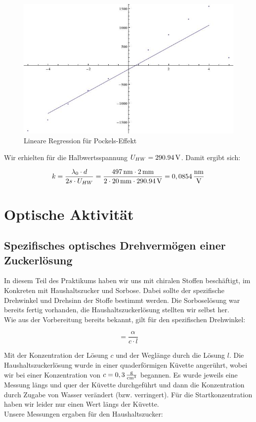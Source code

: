 \documentclass[a4paper,titlepage]{scrartcl}
\numberwithin{equation}{section}
\begin{document}
\begin{figure}[H]
\centering
\includegraphics[scale=.7]{bilder/aufgabe34.jpg} 
\caption{Lineare Regression für Pockels-Effekt}
\end{figure}

Wir erhielten für die Halbwertsspannung $U_{HW}= \unit[290.94]{V}$. Damit ergibt sich:

\begin{equation*}
k= \frac{\lambda_0 \cdot d}{2s \cdot U_{HW}}= \frac{\unit[497]{nm} \cdot \unit[2]{mm}}{2 \cdot \unit[20]{mm} \cdot \unit[290.94]{V}} = \unit[0,0854]{\frac{nm}{V}}
\end{equation*}
\section{Optische Aktivität}
\subsection{Spezifisches optisches Drehvermögen einer Zuckerlösung}
In diesem Teil des Praktikums haben wir uns mit chiralen Stoffen beschäftigt, im Konkreten mit Haushaltszucker und Sorbose. Dabei sollte der spezifische Drehwinkel und Drehsinn der Stoffe bestimmt werden. Die Sorboselösung war bereits fertig vorhanden, die Haushaltszuckerlösung stellten wir selbst her.\\
Wie aus der Vorbereitung bereits bekannt, gilt für den spezifischen Drehwinkel:

\begin{equation*}
[\alpha] = \frac{\alpha}{c \cdot l}
\end{equation*}

Mit der Konzentration der Lösung $c$ und der Weglänge durch die Lösung $l$. Die Haushaltszuckerlösung wurde in einer quaderförmigen Küvette angerührt, wobei wir bei einer Konzentration von $c = \unit[0,3]{\frac{g}{{cm}^3}}$ begannen. Es wurde jeweils eine Messung längs und quer der Küvette durchgeführt und dann die Konzentration durch Zugabe von Wasser verändert (bzw. verringert). Für die Startkonzentration haben wir leider nur einen Wert längs der Küvette.\\
Unsere Messungen ergaben für den Haushaltszucker:
\end{document}
